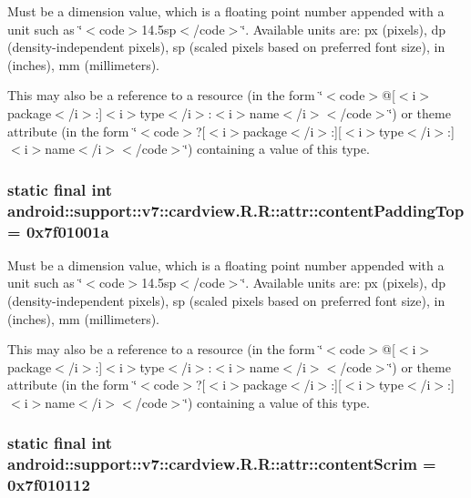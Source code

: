 Must be a dimension value, which is a floating point number appended with a unit such as \char`\"{}$<$code$>$14.5sp$<$/code$>$\char`\"{}. Available units are: px (pixels), dp (density-independent pixels), sp (scaled pixels based on preferred font size), in (inches), mm (millimeters). 

This may also be a reference to a resource (in the form \char`\"{}$<$code$>$@\mbox{[}$<$i$>$package$<$/i$>$:\mbox{]}$<$i$>$type$<$/i$>$:$<$i$>$name$<$/i$>$$<$/code$>$\char`\"{}) or theme attribute (in the form \char`\"{}$<$code$>$?\mbox{[}$<$i$>$package$<$/i$>$:\mbox{]}\mbox{[}$<$i$>$type$<$/i$>$:\mbox{]}$<$i$>$name$<$/i$>$$<$/code$>$\char`\"{}) containing a value of this type. \hypertarget{classandroid_1_1support_1_1v7_1_1cardview_1_1_r_1_1attr_c1fadfe0af3497bd8a8c35e8c60f83bd}{
\subsubsection[{contentPaddingTop}]{\setlength{\rightskip}{0pt plus 5cm}static final int android::support::v7::cardview.R.R::attr::contentPaddingTop = 0x7f01001a}}
\label{classandroid_1_1support_1_1v7_1_1cardview_1_1_r_1_1attr_c1fadfe0af3497bd8a8c35e8c60f83bd}


Must be a dimension value, which is a floating point number appended with a unit such as \char`\"{}$<$code$>$14.5sp$<$/code$>$\char`\"{}. Available units are: px (pixels), dp (density-independent pixels), sp (scaled pixels based on preferred font size), in (inches), mm (millimeters). 

This may also be a reference to a resource (in the form \char`\"{}$<$code$>$@\mbox{[}$<$i$>$package$<$/i$>$:\mbox{]}$<$i$>$type$<$/i$>$:$<$i$>$name$<$/i$>$$<$/code$>$\char`\"{}) or theme attribute (in the form \char`\"{}$<$code$>$?\mbox{[}$<$i$>$package$<$/i$>$:\mbox{]}\mbox{[}$<$i$>$type$<$/i$>$:\mbox{]}$<$i$>$name$<$/i$>$$<$/code$>$\char`\"{}) containing a value of this type. \hypertarget{classandroid_1_1support_1_1v7_1_1cardview_1_1_r_1_1attr_d652db52ccc48f7a705be533384f3045}{
\subsubsection[{contentScrim}]{\setlength{\rightskip}{0pt plus 5cm}static final int android::support::v7::cardview.R.R::attr::contentScrim = 0x7f010112}}
\label{classandroid_1_1support_1_1v7_1_1cardview_1_1_r_1_1attr_d652db52ccc48f7a705be533384f3045}


